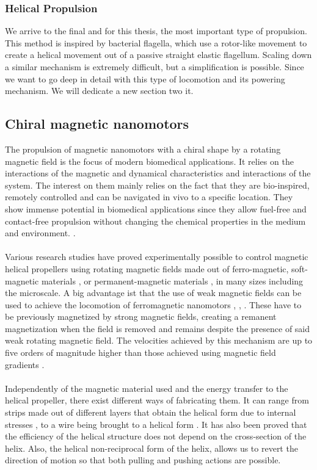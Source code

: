 \subsubsection{Helical Propulsion}
We arrive to the final and for this thesis, the most important type of propulsion. This method is inspired by bacterial flagella, which use a rotor-like movement to create a helical movement out of a passive straight elastic flagellum. Scaling down a similar mechanism is extremely difficult, but a simplification is possible. Since we want to go deep in detail with this type of locomotion and its powering mechanism. We will dedicate a new section two it.

\subsection{Chiral magnetic nanomotors}
The propulsion of magnetic nanomotors with a chiral shape by a rotating magnetic field is the focus of modern biomedical applications. It relies on the interactions of the magnetic and dynamical characteristics and interactions of the system. The interest on them mainly relies on the fact that they are bio-inspired, remotely controlled and can be navigated in vivo to a specific location. They show immense potential in biomedical applications since they allow fuel-free and contact-free propulsion without changing the chemical properties in the medium and environment. \cite{Morozov2014a}. \\\\
Various research studies have proved experimentally possible to control magnetic helical propellers using rotating magnetic fields made out of ferro-magnetic, soft-magnetic materials \cite{Zhang2009}, \cite{Zhang2009a} or permanent-magnetic materials \cite{Honda1996}, \cite{Ghost2009} in many sizes including the microscale. A big advantage ist that the use of weak magnetic fields can be used to achieve the locomotion of ferromagnetic nanomotors \cite{Solovev2009}, \cite{Ghosh2009}, \cite{Wang2013}. These have to be previously magnetized by strong magnetic fields, creating a remanent magnetization when the field is removed and remains despite the presence of said weak rotating magnetic field. The velocities achieved by this mechanism are up to five orders of magnitude higher than those achieved using magnetic field gradients \cite{Nelson2010}. \\\\
Independently of the magnetic material used and the energy transfer to the helical propeller, there exist different ways of fabricating them. It can range from strips made out of different layers that obtain the helical form due to internal stresses \cite{Zhang2009}, \cite{Zhang2009a} to a wire being brought to a helical form \cite{Honda1996}. It has also been proved \cite{Purcell1977} that the efficiency of the helical structure does not depend on the cross-section of the helix. Also, the helical non-reciprocal form of the helix, allows us to revert the direction of motion so that both pulling and pushing actions are possible. \\\\
